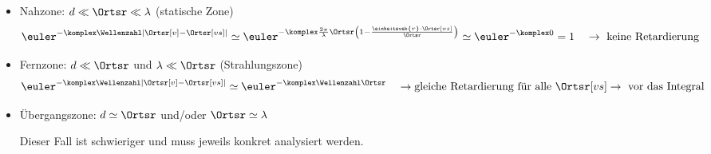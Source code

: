 \begin{frame}
\begin{columns}
  \end{columns}
  \begin{itemize}[<+->]
  \item \alert{Nahzone}: \(d \ll \Ortsr \ll \lambda\) (statische Zone)
    \begin{equation*}
      \euler^{-\komplex \Wellenzahl |\Ortsr[v]-\Ortsr[vs]|} \simeq \euler^{-\komplex \frac{2\pi}{\lambda}\Ortsr \left(1 - \frac{\einheitsvek{r}\cdot \Ortsr[vs]}{\Ortsr} \right) } \simeq \euler^{-\komplex 0} =1 \quad \to \text{ keine Retardierung}
    \end{equation*}
  \item \alert{Fernzone}: \(d \ll \Ortsr\) und \(\lambda \ll \Ortsr\) (Strahlungszone)
    \begin{equation*}
      \euler^{-\komplex \Wellenzahl |\Ortsr[v]-\Ortsr[vs]|} \simeq \euler^{-\komplex \Wellenzahl \Ortsr} \quad\to \text{gleiche Retardierung für alle }\Ortsr[vs] \to \text{ vor das Integral}
    \end{equation*}
  \item \alert{Übergangszone}: \(d \simeq \Ortsr\) und/oder \(\Ortsr\simeq\lambda\)

    Dieser Fall ist schwieriger und muss jeweils konkret analysiert werden.
  \end{itemize}
\end{frame}



   

